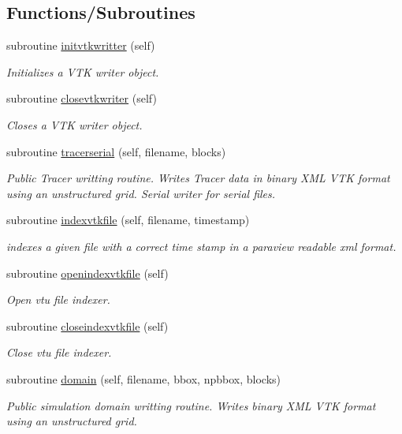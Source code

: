\subsection*{Functions/\+Subroutines}
\begin{DoxyCompactItemize}
\item 
subroutine \mbox{\hyperlink{namespacevtkwritter__mod_abd35d591c8e15730a277b2d26deb83e8}{initvtkwritter}} (self)
\begin{DoxyCompactList}\small\item\em Initializes a V\+TK writer object. \end{DoxyCompactList}\item 
subroutine \mbox{\hyperlink{namespacevtkwritter__mod_a13f1b870d2367704bcd4143a80b552f9}{closevtkwriter}} (self)
\begin{DoxyCompactList}\small\item\em Closes a V\+TK writer object. \end{DoxyCompactList}\item 
subroutine \mbox{\hyperlink{namespacevtkwritter__mod_ac11e4d1d71141e6de89ba67508212ce0}{tracerserial}} (self, filename, blocks)
\begin{DoxyCompactList}\small\item\em Public Tracer writting routine. Writes Tracer data in binary X\+ML V\+TK format using an unstructured grid. Serial writer for serial files. \end{DoxyCompactList}\item 
subroutine \mbox{\hyperlink{namespacevtkwritter__mod_a4c50b52b496bad6b053ffd5749da1582}{indexvtkfile}} (self, filename, timestamp)
\begin{DoxyCompactList}\small\item\em indexes a given file with a correct time stamp in a paraview readable xml format. \end{DoxyCompactList}\item 
subroutine \mbox{\hyperlink{namespacevtkwritter__mod_a0c26bb22a8b7dd9f9da69309ad65d669}{openindexvtkfile}} (self)
\begin{DoxyCompactList}\small\item\em Open vtu file indexer. \end{DoxyCompactList}\item 
subroutine \mbox{\hyperlink{namespacevtkwritter__mod_a6f9a731d9dee5651f85d4aeed3f3ea5d}{closeindexvtkfile}} (self)
\begin{DoxyCompactList}\small\item\em Close vtu file indexer. \end{DoxyCompactList}\item 
subroutine \mbox{\hyperlink{namespacevtkwritter__mod_a9f44d9fd1c5da759c4f2d721d12a8181}{domain}} (self, filename, bbox, npbbox, blocks)
\begin{DoxyCompactList}\small\item\em Public simulation domain writting routine. Writes binary X\+ML V\+TK format using an unstructured grid. \end{DoxyCompactList}\end{DoxyCompactItemize}



